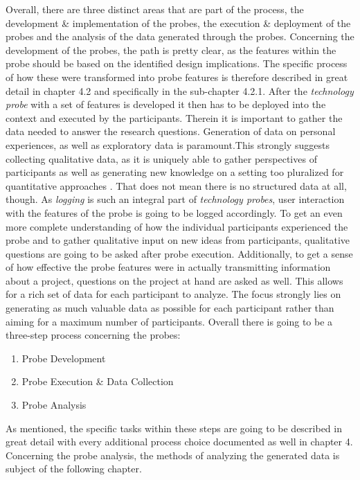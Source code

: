 Overall, there are three distinct areas that are part of the process, the development \& implementation of the probes, the execution \& deployment of the probes and the analysis of the data generated through the probes. Concerning the development of the probes, the path is pretty clear, as the features within the probe should be based on the identified design implications. The specific process of how these were transformed into probe features is therefore described in great detail in chapter 4.2 and specifically in the sub-chapter 4.2.1. After the \textit{technology probe} with a set of features is developed it then has to be deployed into the context and executed by the participants. Therein it is important to gather the data needed to answer the research questions. Generation of data on personal experiences, as well as exploratory data is paramount.This strongly suggests collecting qualitative data, as it is uniquely able to gather perspectives of participants \cite[p. 7-8]{flick2018introduction} as well as generating new knowledge on a setting too pluralized for quantitative approaches \cite[p. 4-5]{flick2018introduction}. That does not mean there is no structured data at all, though. As \textit{logging} is such an integral part of \textit{technology probes}, user interaction with the features of the probe is going to be logged accordingly. To get an even more complete understanding of how the individual participants experienced the probe and to gather qualitative input on new ideas from participants, qualitative questions are going to be asked after probe execution. Additionally, to get a sense of how effective the probe features were in actually transmitting information about a project, questions on the project at hand are asked as well. This allows for a rich set of data for each participant to analyze. The focus strongly lies on generating as much valuable data as possible for each participant rather than aiming for a maximum number of participants. Overall there is going to be a three-step process concerning the probes:

\begin{enumerate}
  \item{Probe Development}
  \item{Probe Execution \& Data Collection}
  \item{Probe Analysis}
\end{enumerate}

As mentioned, the specific tasks within these steps are going to be described in great detail with every additional process choice documented as well in chapter 4. Concerning the probe analysis, the methods of analyzing the generated data is subject of the following chapter.

